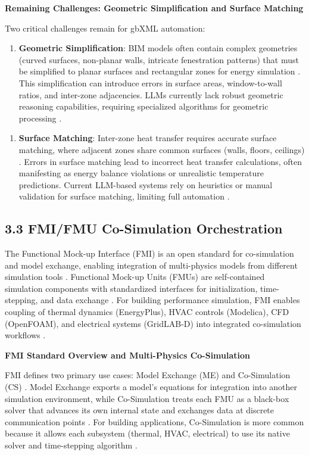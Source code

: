 \documentclass[12pt,a4paper]{article}
\begin{document}
\textbf{Remaining Challenges: Geometric Simplification and Surface Matching}

Two critical challenges remain for gbXML automation:

\begin{enumerate}
  \item \textbf{Geometric Simplification}: BIM models often contain complex geometries (curved surfaces, non-planar walls, intricate fenestration patterns) that must be simplified to planar surfaces and rectangular zones for energy simulation \cite{ref72}. This simplification can introduce errors in surface areas, window-to-wall ratios, and inter-zone adjacencies. LLMs currently lack robust geometric reasoning capabilities, requiring specialized algorithms for geometric processing \cite{ref73}.
\end{enumerate}

\begin{enumerate}
  \item \textbf{Surface Matching}: Inter-zone heat transfer requires accurate surface matching, where adjacent zones share common surfaces (walls, floors, ceilings) \cite{ref74}. Errors in surface matching lead to incorrect heat transfer calculations, often manifesting as energy balance violations or unrealistic temperature predictions. Current LLM-based systems rely on heuristics or manual validation for surface matching, limiting full automation \cite{ref75}.
\end{enumerate}

\subsection{3.3 FMI/FMU Co-Simulation Orchestration}

The Functional Mock-up Interface (FMI) is an open standard for co-simulation and model exchange, enabling integration of multi-physics models from different simulation tools \cite{ref76}. Functional Mock-up Units (FMUs) are self-contained simulation components with standardized interfaces for initialization, time-stepping, and data exchange \cite{ref77}. For building performance simulation, FMI enables coupling of thermal dynamics (EnergyPlus), HVAC controls (Modelica), CFD (OpenFOAM), and electrical systems (GridLAB-D) into integrated co-simulation workflows \cite{ref78}.

\textbf{FMI Standard Overview and Multi-Physics Co-Simulation}

FMI defines two primary use cases: Model Exchange (ME) and Co-Simulation (CS) \cite{ref79}. Model Exchange exports a model's equations for integration into another simulation environment, while Co-Simulation treats each FMU as a black-box solver that advances its own internal state and exchanges data at discrete communication points \cite{ref80}. For building applications, Co-Simulation is more common because it allows each subsystem (thermal, HVAC, electrical) to use its native solver and time-stepping algorithm \cite{ref81}.
\end{document}
